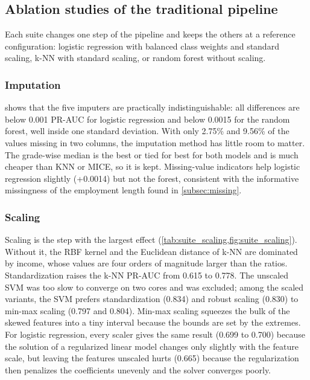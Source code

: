 

\subsection{Ablation studies of the traditional pipeline}
\label{subsec:ablation}
Each suite changes one step of the pipeline and keeps the others at a reference configuration: logistic regression with balanced class weights and standard scaling, k-NN with standard scaling, or random forest without scaling.

\subsubsection{Imputation}
 shows that the five imputers are practically indistinguishable: all differences are below 0.001 PR-AUC for logistic regression and below 0.0015 for the random forest, well inside one standard deviation.
With only 2.75\% and 9.56\% of the values missing in two columns, the imputation method has little room to matter.
The grade-wise median is the best or tied for best for both models and is much cheaper than KNN or MICE, so it is kept.
Missing-value indicators help logistic regression slightly (+0.0014) but not the forest, consistent with the informative missingness of the employment length found in \cref{subsec:missing}.



\subsubsection{Scaling}
Scaling is the step with the largest effect (\cref{tab:suite_scaling,fig:suite_scaling}).
Without it, the RBF kernel and the Euclidean distance of k-NN are dominated by income, whose values are four orders of magnitude larger than the ratios.
Standardization raises the k-NN PR-AUC from 0.615 to 0.778.
The unscaled SVM was too slow to converge on two cores and was excluded; among the scaled variants, the SVM prefers standardization (0.834) and robust scaling (0.830) to min-max scaling (0.797 and 0.804).
Min-max scaling squeezes the bulk of the skewed features into a tiny interval because the bounds are set by the extremes.
For logistic regression, every scaler gives the same result (0.699 to 0.700) because the solution of a regularized linear model changes only slightly with the feature scale, but leaving the features unscaled hurts (0.665) because the regularization then penalizes the coefficients unevenly and the solver converges poorly.

